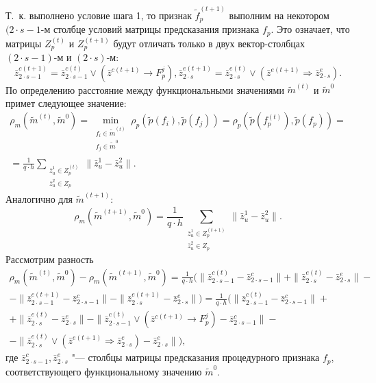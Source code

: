 \begin{Proof}
	Т.~к. выполнено условие шага 1, то признак $\tilde f_p^{(t+1)}$ выполним на некотором $(2\cdot s-1$-м столбце условий матрицы предсказания признака $f_p$. Это означает, что матрицы $Z_p^{(t)}$ и $Z_p^{(t+1)}$ будут отличать только в двух вектор-столбцах $(2\cdot s-1)$-м и $(2\cdot s)$-м:
	\begin{equation}
		\bar z_{2\cdot s-1}^{c(t+1)}=\bar z_{2\cdot s-1}^{c(t)}\vee (\bar z^{c(t+1)}\rightarrow F_p^j),\bar z_{2\cdot s}^{e(t+1)}=\bar z_{2\cdot s}^{e(t)}\vee(\bar z^{e(t+1)}\Rightarrow \bar z_{2\cdot s}^e).
	\end{equation}
	По определению расстояние между функциональными значениями $\tilde m^{(t)}$ и $\tilde m^0$ примет следующее значение:
	\begin{eqnarray}
		\rho_m(\tilde m^{(t)},\tilde m^0)=\min\limits_{\substack{f_i\in\tilde m^{(t)}\\f_j\in\tilde m^0}}\rho_p(\tilde p(f_i),\tilde p(f_j ))=\rho_p(\tilde p(f_p^{(t)}),\tilde p(f_p))=\nonumber \\
		=\frac{1}{q\cdot h}\sum\limits_{\substack{\bar z_u^1\in Z_p^{(t)}\\\bar z_u^2\in Z_p}}\|\bar z_u^1-\bar z_u^2\|.
	\end{eqnarray}
	Аналогично для $\tilde m^{(t+1)}$:
	\begin{equation}
		\rho_m(\tilde m^{(t+1)},\tilde m^0)=\frac{1}{q\cdot h}\sum_{\substack{\bar z_u^1\in Z_p^{(t+1)}\\\bar z_u^2\in Z_p}}\|\bar z_u^1-\bar z_u^2\|.
	\end{equation}
	Рассмотрим разность 
	\begin{eqnarray}
		\rho_m(\tilde m^{(t)},\tilde m^0)-\rho_m(\tilde m^{(t+1)},\tilde m^0)=\frac{1}{q\cdot h}(\|\bar z_{2\cdot s-1}^{c(t)}-\bar z_{2\cdot s-1}^c\|+\|\bar z_{2\cdot s}^{e(t)}-\bar z_{2\cdot s}^e\|-\nonumber \\
		-\|\bar z_{2\cdot s-1}^{c(t+1)}-\bar z_{2\cdot s-1}^c\|-\|\bar z_{2\cdot s}^{e(t+1)}-\bar z_{2\cdot s}^e\|)=\frac{1}{q\cdot h}(\|\bar z_{2\cdot s-1}^{c(t)}-\bar z_{2\cdot s-1}^c\|+\nonumber \\
		+\|\bar z_{2\cdot s}^{e(t)}-\bar z_{2\cdot s}^e\|-\|\bar z_{2\cdot s-1}^{c(t)}\vee(\bar z^{c(t+1)}\rightarrow F_p^j)-\bar z_{2\cdot s-1}^c\|-\nonumber \\
		-\|\bar z_{2\cdot s}^{e(t)}\vee(\bar z^{e(t+1)}\Rightarrow\bar z_{2\cdot s}^e)-\bar z_{2\cdot s}^e\|),
	\end{eqnarray}
	где $\bar z_{2\cdot s-1}^c,\bar z_{2\cdot s}^e$ "--- столбцы матрицы предсказания процедурного признака $f_p$, соответствующего функциональному значению $\tilde m^0$.
	

\end{Proof}
